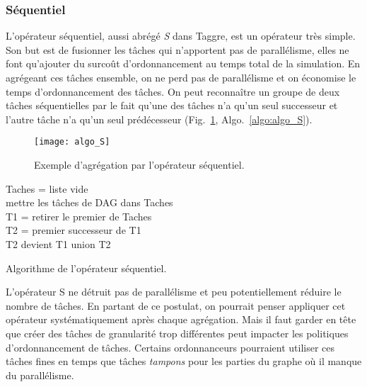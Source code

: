 \subsubsection{Séquentiel}
L'opérateur séquentiel, aussi abrégé {\em S} dans Taggre, est un opérateur très simple.
%
Son but est de fusionner les tâches qui n'apportent pas de parallélisme, elles ne font qu'ajouter du surcoût d'ordonnancement au temps total de la simulation.
%
En agrégeant ces tâches ensemble, on ne perd pas de parallélisme et on économise le temps d'ordonnancement des tâches.
%
On peut reconnaître un groupe de deux tâches séquentielles par le fait qu'une des tâches n'a qu'un seul successeur et l'autre tâche n'a qu'un seul prédécesseur (Fig.~\ref{fig:algo_S}, Algo.~\ref{algo:algo_S}).

\begin{figure}[!h]
  \centering
  \texttt{[image: algo\_S]}
  \caption{Exemple d'agrégation par l'opérateur séquentiel.}
  \label{fig:algo_S}
\end{figure}
\begin{algorithm}
  {\sc Taches} = liste vide \\
  mettre les tâches de DAG dans {\sc Taches} \\
   {
    {\sc T1} = retirer le premier de {\sc Taches} \\
     {
      {\sc T2} = premier successeur de {\sc T1} \\
       {
        {\sc T2} devient {\sc T1} union {\sc T2}\\
      }
    }
  }
  \caption{Algorithme de l'opérateur séquentiel.}
  \label{algo:algo_S}
\end{algorithm}
L'opérateur S ne détruit pas de parallélisme et peu potentiellement réduire le nombre de tâches.
%
En partant de ce postulat, on pourrait penser appliquer cet opérateur systématiquement après chaque agrégation.
%
Mais il faut garder en tête que créer des tâches de granularité trop différentes peut impacter les politiques d'ordonnancement de tâches.
%
Certains ordonnanceurs pourraient utiliser ces tâches fines en temps que tâches {\em tampons} pour les parties du graphe où il manque du parallélisme.
